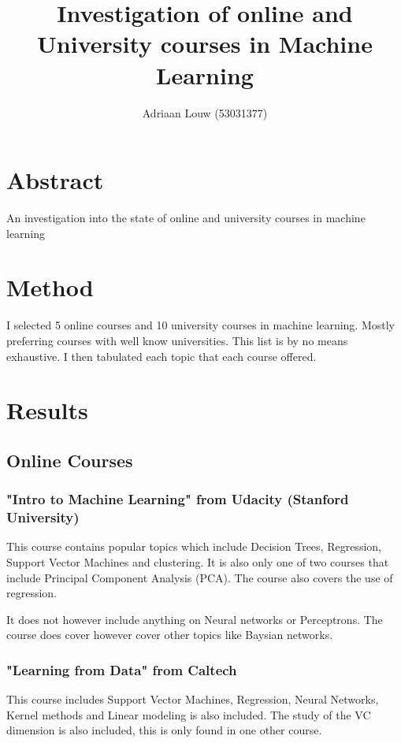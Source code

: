 \documentclass[10pt,a4paper]{article}
\title{Investigation of online and University courses in Machine Learning}
\author{ Adriaan Louw (53031377)}
\begin{document}
\maketitle

\tableofcontents

\section{Abstract}
An investigation into the state of online and university courses in machine learning

\section{Method}
I selected 5 online courses and 10 university courses in machine learning. Mostly preferring courses with well know universities. This list is by no means exhaustive. I then tabulated each topic that each course offered.

\section{Results}

\subsection{Online Courses}
\subsubsection{"Intro to Machine Learning" from Udacity (Stanford University)}

This course contains popular topics which include Decision Trees, Regression, Support Vector Machines and clustering. It is also only one of two courses that include Principal Component Analysis (PCA). The course also covers the use of regression.

It does not however include anything on Neural networks or Perceptrons. The course does cover however  cover other topics like Baysian networks. \citep{stan}

\subsubsection{"Learning from Data" from Caltech }

This course includes Support Vector Machines, Regression, Neural Networks, Kernel methods and Linear modeling is also included. The study of the VC dimension is also included, this is only found in one other course.
\end{document}
